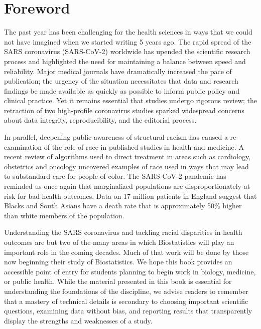 \chapter*{Foreword}

The past year has been challenging for the health sciences in ways that we could not have imagined when we started writing 5 years ago. The rapid spread of the SARS coronavirus (SARS-CoV-2) worldwide has upended the scientific research process and highlighted the need for maintaining a balance between speed and reliability. Major medical journals have dramatically increased the pace of publication; the urgency of the situation necessitates that data and research findings be made available as quickly as possible to inform public policy and clinical practice. Yet it remains essential that studies undergo rigorous review; the retraction of two high-profile coronavirus studies 
sparked widespread concerns about data integrity, reproducibility, and the editorial process.

In parallel, deepening public awareness of structural racism has caused a re-examination of the role of race in published studies in health and medicine.  A recent review of algorithms used to direct treatment in areas such as cardiology, obstetrics and oncology uncovered examples of race used in ways that may lead to substandard care for people of color.  The SARS-CoV-2 pandemic has reminded us once again that marginalized populations are disproportionately at risk for bad health outcomes. Data on 17 million patients in England  suggest that Blacks and South Asians have a death rate that is approximately 50\% higher than white members of the population. 

Understanding the SARS coronavirus and tackling racial disparities in health outcomes are but two of the many areas in which Biostatistics will play an important role in the coming decades. Much of that work will be done by those now beginning their study of Biostatistics. We hope this book provides an accessible point of entry for students planning to begin work in biology, medicine, or public health. While the material presented in this book is essential for understanding the foundations of the discipline, we advise readers to remember that a mastery of technical details is secondary to choosing important scientific questions, examining data without bias, and reporting results that transparently display the strengths and weaknesses of a study.

